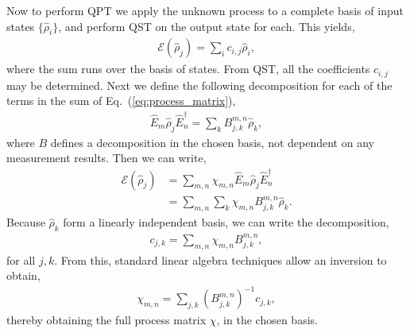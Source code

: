 Now to perform QPT we apply the unknown process to a complete basis of input states $\{\hat\rho_i\}$, and perform QST on the output state for each. This yields,
\begin{align}
\mathcal{E}(\hat\rho_j) = \sum_{i} c_{i,j} \hat\rho_i,
\end{align}
where the sum runs over the basis of states. From QST, all the coefficients $c_{i,j}$ may be determined. Next we define the following decomposition for each of the terms in the sum of Eq.~(\ref{eq:process_matrix}),
\begin{align}
\hat{E}_m \hat\rho_j \hat{E}_n^\dag = \sum_k B^{m,n}_{j,k} \hat\rho_k,
\end{align}
where $B$ defines a decomposition in the chosen basis, not dependent on any measurement results. Then we can write,
\begin{align}
\mathcal{E}(\hat\rho_j) &= \sum_{m,n} \chi_{m,n} \hat{E}_m\hat\rho_j\hat{E}_n^\dag \nonumber \\
&= \sum_{m,n} \sum_k \chi_{m,n} B^{m,n}_{j,k} \hat\rho_k.
\end{align}
Because $\hat\rho_k$ form a linearly independent basis, we can write the decomposition,
\begin{align}
c_{j,k} = \sum_{m,n} \chi_{m,n} B_{j,k}^{m,n},
\end{align}
for all \mbox{$j,k$}. From this, standard linear algebra techniques allow an inversion to obtain,
\begin{align}
\chi_{m,n} = \sum_{j,k} (B_{j,k}^{m,n})^{-1} c_{j,k},
\end{align}
thereby obtaining the full process matrix $\chi$, in the chosen basis.